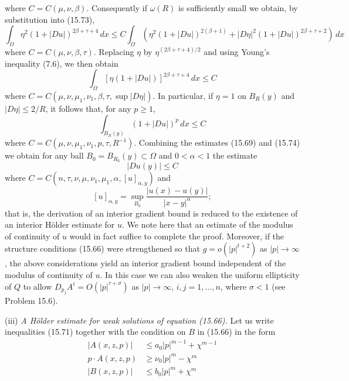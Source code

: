 
where $C=C(\mu,\nu,\beta)$. Consequently if $\omega(R)$ is sufficiently small we obtain, by substitution into (15.73),
\[
\int_{\Omega}\eta^2(1+|Du|)^{2\beta+\tau+4}\,dx
\leq C\int_{\Omega}\left(\eta^2(1+|Du|)^{2(\beta+1)}+|D\eta|^2(1+|Du|)^{2\beta+\tau+2}\right)\,dx
\]
where $C=C(\mu,\nu,\beta,\tau)$. Replacing $\eta$ by $\eta^{(2\beta+\tau+4)/2}$ and using Young's inequality (7.6), we then obtain
\[
\int_{\Omega}[\eta(1+|Du|)]^{2\beta+\tau+4}\,dx\leq C
\]
where $C=C(\mu,\nu,\mu_1,\nu_1,\beta,\tau,\sup |D\eta|)$. In particular, if $\eta=1$ on $B_R(y)$ and $|D\eta|\leq 2/R$, it follows that, for any $p\geq 1$,
\begin{equation}\tag{15.74}
\int_{B_R(y)}(1+|Du|)^p\,dx\leq C
\end{equation}
where $C=C(\mu,\nu,\mu_1,\nu_1,p,\tau,R^{-1})$. Combining the estimates (15.69) and (15.74) we obtain for any ball $B_0=B_{R_0}(y)\subset\Omega$ and $0<\alpha<1$ the estimate
\begin{equation}\tag{15.75}
|Du(y)|\leq C
\end{equation}
where $C=C(n,\tau,\nu,\mu,\nu_1,\mu_1,\alpha,[u]_{\alpha,y})$ and
\[
[u]_{\alpha,y}=\sup_{B_0}\frac{|u(x)-u(y)|}{|x-y|^\alpha};
\]
that is, the derivation of an interior gradient bound is reduced to the existence of an interior H\"older estimate for $u$. We note here that an estimate of the modulus of continuity of $u$ would in fact suffice to complete the proof. Moreover, if the structure conditions (15.66) were strengthened so that $g=o(|p|^{t+2})$ as $|p|\to\infty$, the above considerations yield an interior gradient bound independent of the modulus of continuity of $u$. In this case we can also weaken the uniform ellipticity of $Q$ to allow $D_{p_j}A^i=O(|p|^{\tau+\sigma})$ as $|p|\to\infty$, $i,j=1,\ldots,n$, where $\sigma<1$ (see Problem 15.6).

\noindent (iii) \textit{A H\"older estimate for weak solutions of equation (15.66).} Let us write inequalities (15.71) together with the condition on $B$ in (15.66) in the form
\begin{equation}\tag{15.76}
\begin{aligned}
|A(x,z,p)|&\leq a_0|p|^{m-1}+\chi^{m-1} \\
p\cdot A(x,z,p)&\geq \nu_0|p|^m-\chi^m \\
|B(x,z,p)|&\leq b_0|p|^m+\chi^m
\end{aligned}
\end{equation}


